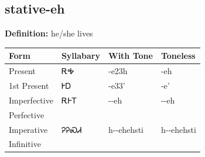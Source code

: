 \documentclass{article}%
\begin{document}
\subsection*{stative-eh}%
\textbf{Definition: }%
he/she lives%
\\[0.5em]%
\begin{tabular}{|l|l|l|l|}%
\hline%
\textbf{Form}&\textbf{Syllabary}&\textbf{With Tone}&\textbf{Toneless}\\%
\hline%
Present&ᎡᎭ&{-}e23h&{-}eh\\%
1st Present&ᎨᎠ&{-}e33'&{-}e'\\%
Imperfective&ᎡᎰᎢ&{-}{-}eh&{-}{-}eh\\%
Perfective&&&\\%
Imperative&ᎮᎮᏍᏗ&h{-}{-}ehehsti&h{-}{-}ehehsti\\%
Infinitive&&&\\%
\hline%
\end{tabular}%
\\[1em]%
\end{document}

